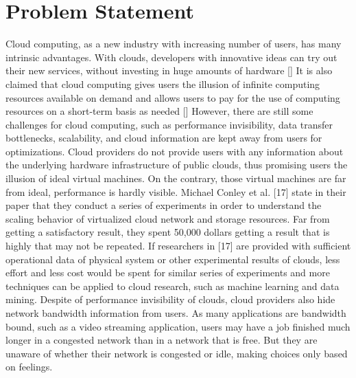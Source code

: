 \section{Problem Statement}
\label{sec:ProblemStatement}





Cloud computing, as a new industry with increasing number of users, has many intrinsic advantages. With clouds, developers with innovative ideas can try out their new services, without investing in huge amounts of hardware [] It is also claimed that cloud computing gives users the illusion of infinite computing resources available on demand and allows users to pay for the use of computing resources on a short-term basis as needed [] However, there are still some challenges for cloud computing, such as performance invisibility, data transfer bottlenecks, scalability, and cloud information are kept away from users for optimizations.
Cloud providers do not provide users with any information about the underlying hardware infrastructure of public clouds, thus promising users the illusion of ideal virtual machines. On the contrary, those virtual machines are far from ideal, performance is hardly visible. Michael Conley et al. [17] state in their paper that they conduct a series of experiments in order to understand the scaling behavior of virtualized cloud network and storage resources. Far from getting a satisfactory result, they spent 50,000 dollars getting a result that is highly that may not be repeated. If researchers in [17] are provided with sufficient operational data of physical system or other experimental results of clouds, less effort and less cost would be spent for similar series of experiments and more techniques can be applied to cloud research, such as machine learning and data mining.
Despite of performance invisibility of clouds, cloud providers also hide network bandwidth information from users. As many applications are bandwidth bound, such as a video streaming application, users may have a job finished much longer in a congested network than in a network that is free. But they are unaware of whether their network is congested or idle, making choices only based on feelings. 
